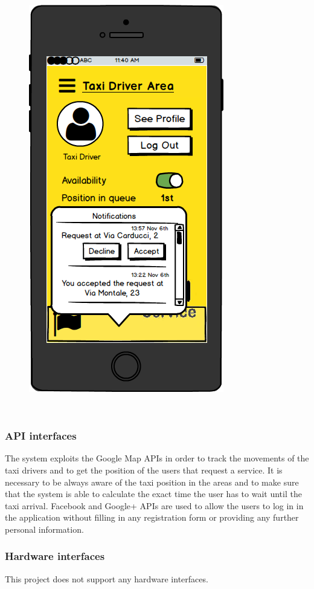 \documentclass[18pt,oneside,a4paper, titlepage]{article}
\begin{document}
\begin{itemize}
				\begin{figure}[h]
					\centering
					\includegraphics[scale=0.3]{MobileAppTaxiDriverNotifications.png}
				\end{figure}
				\\
			\end{itemize}
		\subsubsection{API interfaces}
			The system exploits the Google Map APIs in order to track the movements of the taxi drivers and to get the position of the users that request a service. It is necessary to be always aware of the taxi position in the areas and to make sure that the system is able to calculate the exact time the user has to wait until the taxi arrival. 
			Facebook and Google+ APIs are used to allow the users to log in in the application without filling in any registration form or providing any further personal information.
			
		\subsubsection{Hardware interfaces}
			This project does not support any hardware interfaces.
\end{document}
